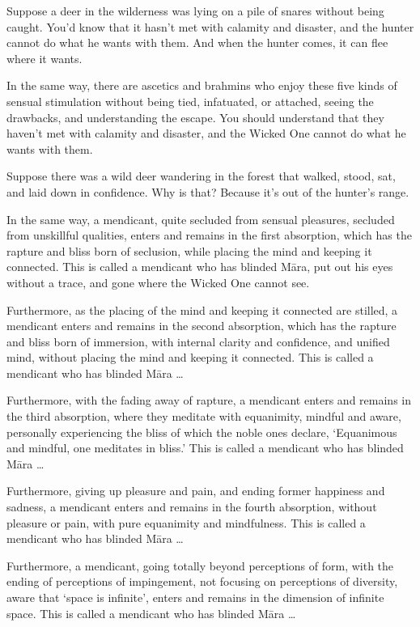 \documentclass[12pt,openany]{book}%
\begin{document}
Suppose a deer in the wilderness was lying on a pile of snares without being caught. You’d know that it hasn’t met with calamity and disaster, and the hunter cannot do what he wants with them. And when the hunter comes, it can flee where it wants. 

In the same way, there are ascetics and brahmins who enjoy these five kinds of sensual stimulation without being tied, infatuated, or attached, seeing the drawbacks, and understanding the escape. You should understand that they haven’t met with calamity and disaster, and the Wicked One cannot do what he wants with them. 

Suppose there was a wild deer wandering in the forest that walked, stood, sat, and laid down in confidence. Why is that? Because it’s out of the hunter’s range. 

In the same way, a mendicant, quite secluded from sensual pleasures, secluded from unskillful qualities, enters and remains in the first absorption, which has the rapture and bliss born of seclusion, while placing the mind and keeping it connected. This is called a mendicant who has blinded \textsanskrit{Māra}, put out his eyes without a trace, and gone where the Wicked One cannot see. 

Furthermore, as the placing of the mind and keeping it connected are stilled, a mendicant enters and remains in the second absorption, which has the rapture and bliss born of immersion, with internal clarity and confidence, and unified mind, without placing the mind and keeping it connected. This is called a mendicant who has blinded \textsanskrit{Māra} … 

Furthermore, with the fading away of rapture, a mendicant enters and remains in the third absorption, where they meditate with equanimity, mindful and aware, personally experiencing the bliss of which the noble ones declare, ‘Equanimous and mindful, one meditates in bliss.’ This is called a mendicant who has blinded \textsanskrit{Māra} … 

Furthermore, giving up pleasure and pain, and ending former happiness and sadness, a mendicant enters and remains in the fourth absorption, without pleasure or pain, with pure equanimity and mindfulness. This is called a mendicant who has blinded \textsanskrit{Māra} … 

Furthermore, a mendicant, going totally beyond perceptions of form, with the ending of perceptions of impingement, not focusing on perceptions of diversity, aware that ‘space is infinite’, enters and remains in the dimension of infinite space. This is called a mendicant who has blinded \textsanskrit{Māra} … 
\end{document}
